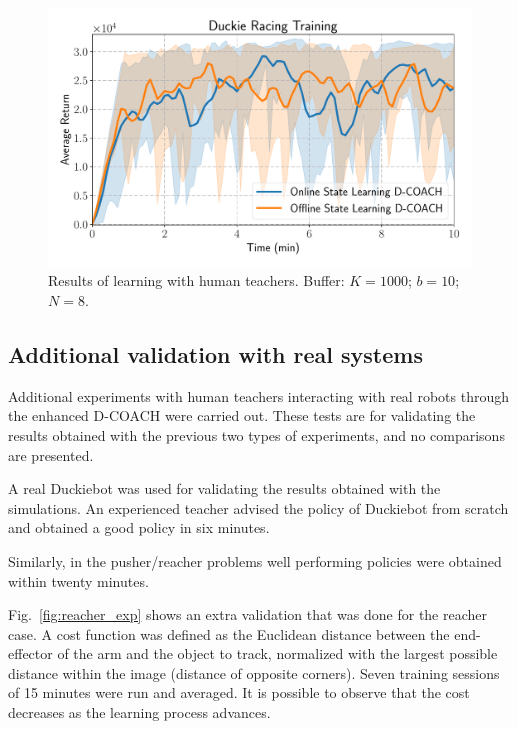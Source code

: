 \begin{figure}[H]
    \centering
    \includegraphics[width=0.9\linewidth]{imagenes/cap3/duckie_human_teacher_ICRA.pdf}
    \caption{Results of learning with human teachers. Buffer: $K = 1000$; $b = 10$; $N = 8$.}
    \label{fig:humanteachers2}
\end{figure}

\subsection{Additional validation with real systems}

Additional experiments with human teachers interacting with real robots through the enhanced D-COACH were carried out. These tests are for validating the results obtained with the previous two types of experiments, and no comparisons are presented.

A real Duckiebot was used for validating the results obtained with the simulations. An experienced teacher advised the policy of Duckiebot from scratch and obtained a good policy in six minutes.

Similarly, in the pusher/reacher problems well performing policies were obtained within twenty minutes. 

Fig.~\ref{fig:reacher_exp} shows an extra validation that was done for the reacher case. A cost function was defined as the Euclidean distance between the end-effector of the arm and the object to track, normalized with the largest possible distance within the image (distance of opposite corners). Seven training sessions of 15 minutes were run and averaged. It is possible to observe that the cost decreases as the learning process advances. 

